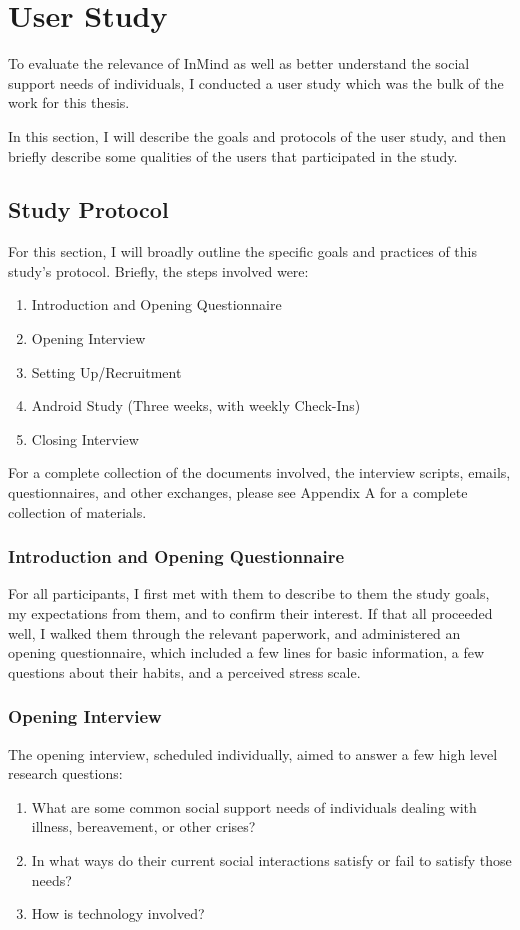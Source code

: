 \chapter{User Study}
To evaluate the relevance of InMind as well as better understand
the social support needs of individuals,
I conducted a user study which was the bulk of the work for this thesis.

In this section, I will describe the goals and protocols of the user study,
and then briefly describe some qualities of the users that participated
in the study.

\section{Study Protocol}
  For this section, I will broadly outline the specific goals
  and practices of this study's protocol.
  Briefly, the steps involved were:
  \begin{enumerate}
  \item Introduction and Opening Questionnaire
  \item Opening Interview
  \item Setting Up/Recruitment
  \item Android Study (Three weeks, with weekly Check-Ins)
  \item Closing Interview
  \end{enumerate}

  For a complete collection of the documents involved,
  the interview scripts, emails, questionnaires, and other exchanges,
  please see Appendix A for a complete collection of materials.

  \subsection{Introduction and Opening Questionnaire}
  For all participants,
  I first met with them to describe to them the study goals,
  my expectations from them, and to confirm their interest.
  If that all proceeded well, I walked them through the relevant paperwork,
  and administered an opening questionnaire,
  which included a few lines for basic information,
  a few questions about their habits,
  and a perceived stress scale.
  
  \subsection{Opening Interview}
  The opening interview, scheduled individually,
  aimed to answer a few high level research questions:
  \begin{enumerate}
  \item What are some common social support needs of individuals
  dealing with illness, bereavement, or other crises?
  \item In what ways do their current social interactions satisfy
  or fail to satisfy those needs?
  \item How is technology involved?
  \end{enumerate}

